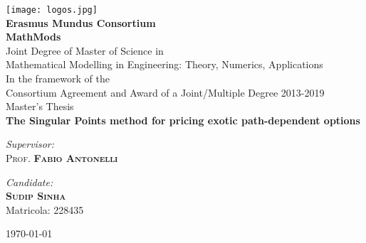 

\begin{titlepage}
	\begin{center}

		\texttt{[image: logos.jpg]} \\[3em]

		{\Large\bfseries Erasmus Mundus Consortium} \\[1em]
		{\LARGE\bfseries MathMods} \\[2em]
		
		{\large Joint Degree of Master of Science in} \\
		{\large Mathematical Modelling in Engineering: Theory, Numerics, Applications} \\[1em]
		
		{\large In the framework of the} \\
		{\large Consortium Agreement and Award of a Joint/Multiple Degree 2013-2019} \\[3em]
		
		{\LARGE Master's Thesis} \\[2em]
		{\Huge\bfseries The Singular Points method for pricing exotic path-dependent options}
		\\[4em]

		\begin{minipage}[t]{0.5\textwidth}
			\begin{center} \Large
				\emph{Supervisor:} \\
				\textsc{\LARGE Prof. \textbf{Fabio Antonelli}}
			\end{center}
		\end{minipage}
		\begin{minipage}[t]{0.4\textwidth}
			\begin{center} \Large
				\emph{Candidate:}\\
				{\LARGE\textbf{\textsc{Sudip Sinha}}}\\
				Matricola: 228435
			\end{center}
		\end{minipage}
		
		\vfill

		{\large \today}

	\end{center}
\end{titlepage}


